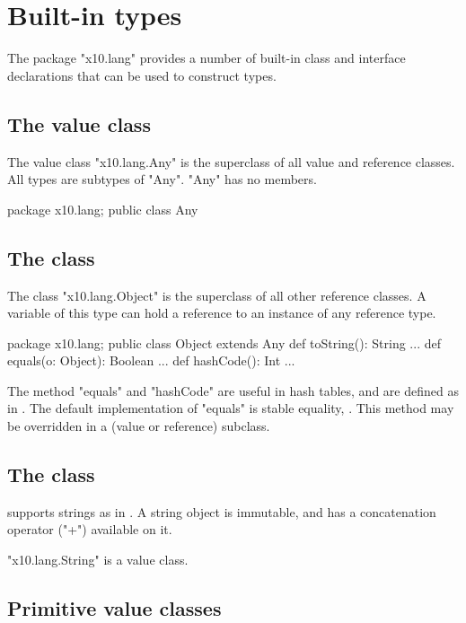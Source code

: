 \section{Built-in types}

The package \xcd"x10.lang" provides a number of built-in class and
interface declarations that can be used to construct types.

\subsection{The value class }\label{Any}

The value class \xcd"x10.lang.Any" is the superclass of all
value and reference classes.  All \Xten{} types are subtypes of
\xcd"Any".  \xcd"Any" has no members.

\begin{xten}
package x10.lang;
public class Any { }
\end{xten}

\subsection{The class }\label{Object}
The class \xcd"x10.lang.Object" is the superclass of all other reference
classes.
A variable of this type can hold a reference to an instance of any
reference type.

\begin{xten}
package x10.lang;
public class Object extends Any {
  def toString(): String {...}
  def equals(o: Object): Boolean {...}
  def hashCode(): Int {...}
}
\end{xten}

The method \xcd"equals" and \xcd"hashCode" are useful in hash tables,
and are defined as in \java. The default implementation of \xcd"equals"
is stable equality, . This method may be overridden
in a (value or reference) subclass.

\subsection{The class }

\Xten{} supports strings as in \java{}. A string object is immutable,
and has a concatenation operator (\xcd"+")  available on it.

\xcd"x10.lang.String" is a value class.


\subsection{Primitive value classes}

